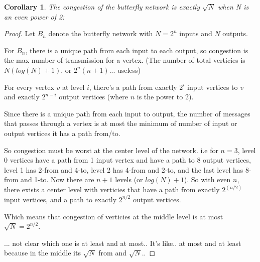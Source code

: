\documentclass[10pt]{article}
\newtheorem{corollary}[theorem]{Corollary}
\begin{document}
\begin{corollary}The congestion of the butterfly network is exactly
  $\sqrt{N}$ when N is an even power of 2:
\end{corollary}
\begin{proof}
Let $B_n$ denote the butterfly network with $N=2^n$ inputs and $N$ outputs.

For $B_n$, there is a unique path from each input to each output,
so congestion is the max number of transmission for a vertex.
(The number of total verticies is $N(log(N)+1)$, or $2^n(n+1)$... useless)

For every vertex $v$ at level $i$, there's a path from exactly $2^i$
input vertices to $v$ and exactly $2^{n-i}$ output vertices (where $n$
is the power to 2).


Since there is a unique path from each input to output,  the number of
messages that passes through a vertex is at most the minimum of number
of input or output vertices it has a path from/to. 
 
So congestion must be worst at the center level of the
network. i.e for $n=3$, level 0 vertices have a path from 1 input
vertex and have a path to 8 output vertices, level 1 has 2-from and
4-to, level 2 has 4-from and 2-to, and the last level has 8-from and
1-to. Now there are $n+1$ levels (or $log(N)+1$). So with even $n$,
there exists a center level with verticies that have a path from exactly $2^{(n/2)}$
input vertices, and a path to exactly $2^{n/2}$ output vertices.

Which means that congestion of verticies at the middle level is at most
$\sqrt{N} = 2^{n/2}$. 

... not clear which one is at least and at most.. It's like.. at most
and at least because in the middle its $\sqrt{N}$ from and $\sqrt{N}$..


  \end{proof}
\end{document}
